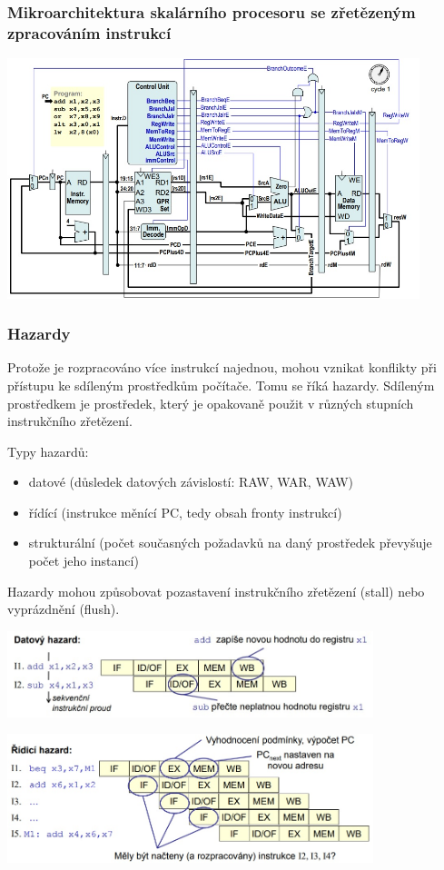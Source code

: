 \subsubsection*{Mikroarchitektura skalárního procesoru se zřetězeným zpracováním instrukcí}

\includegraphics[width=0.9\textwidth]{img/OB-4_1.jpg}

\subsubsection*{Hazardy}
Protože je rozpracováno více instrukcí najednou, mohou vznikat konflikty při
přístupu ke sdíleným prostředkům počítače. Tomu se říká hazardy.
Sdíleným prostředkem je prostředek, který je opakovaně použit v různých
stupních instrukčního zřetězení.

Typy hazardů:
\begin{itemize}
	\item datové (důsledek datových závislostí: RAW, WAR, WAW)
	\item řídící (instrukce měnící PC, tedy obsah fronty instrukcí)
	\item strukturální (počet současných požadavků na daný prostředek převyšuje počet jeho instancí)
\end{itemize}

Hazardy mohou způsobovat pozastavení instrukčního zřetězení (stall) nebo vyprázdnění (flush).

\includegraphics[width=0.8\textwidth]{img/OB-4_2.jpg}

\includegraphics[width=0.8\textwidth]{img/OB-4_3.jpg}

